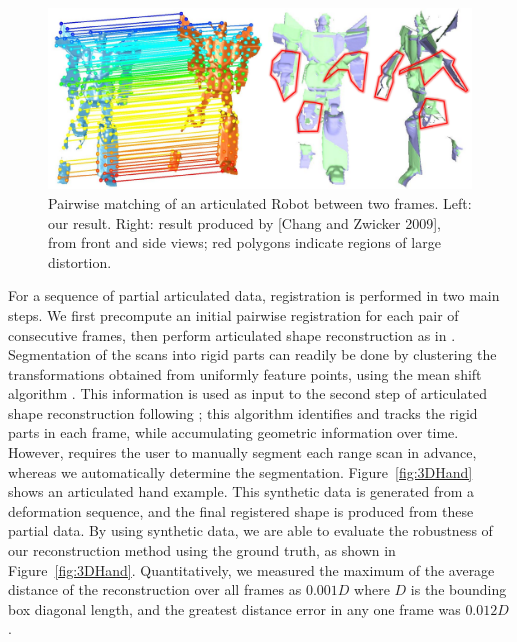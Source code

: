 \begin{figure}[t!]
\centering
  \includegraphics[width=0.95\linewidth]{figures/Robot.pdf}
  \caption{Pairwise matching of an articulated Robot between two frames.
           Left: our result. Right: result produced by [Chang and Zwicker 2009], from front and side views; red polygons indicate regions of large distortion.}
\label{fig:3DRobot}
\end{figure}

For a sequence of partial articulated data, registration is performed in two main steps.
We first precompute an initial pairwise registration for each pair of consecutive frames, then perform articulated shape reconstruction as in \cite{Pekelny08}.
Segmentation of the scans into rigid parts can readily be done by clustering the transformations obtained from uniformly feature points,
using the mean shift algorithm \cite{Comaniciu02}.
This information is used as input to the second step of articulated shape reconstruction following \cite{Pekelny08};
this algorithm identifies and tracks the rigid parts in each frame, while accumulating  geometric information over time.
However, \cite{Pekelny08} requires the user to manually segment each range scan in advance, whereas we automatically determine  the segmentation.
Figure~\ref{fig:3DHand} shows an articulated hand example.
This synthetic data is generated from a deformation sequence, and the final registered shape is produced from these partial data.
By using synthetic data, we are able to evaluate the robustness of our reconstruction method using the ground truth, as shown in Figure~\ref{fig:3DHand}.
Quantitatively, we measured the maximum of the average distance of the reconstruction over all frames as $0.001 D$ where $D$ is the bounding box diagonal length, and
the greatest distance error in any one frame was $0.012 D$.

